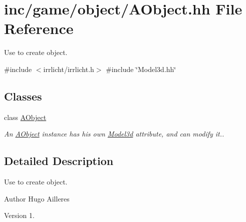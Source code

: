 \hypertarget{AObject_8hh}{}\section{inc/game/object/\+A\+Object.hh File Reference}
\label{AObject_8hh}


Use to create object.  


{\ttfamily \#include $<$irrlicht/irrlicht.\+h$>$}\newline
{\ttfamily \#include \char`\"{}Model3d.\+hh\char`\"{}}\newline
\subsection*{Classes}
\begin{DoxyCompactItemize}
\item 
class \hyperlink{classAObject}{A\+Object}
\begin{DoxyCompactList}\small\item\em An \hyperlink{classAObject}{A\+Object} instance has his own \hyperlink{classModel3d}{Model3d} attribute, and can modify it.. \end{DoxyCompactList}\end{DoxyCompactItemize}


\subsection{Detailed Description}
Use to create object. 

\begin{DoxyAuthor}{Author}
Hugo Ailleres 
\end{DoxyAuthor}
\begin{DoxyVersion}{Version}
1. 
\end{DoxyVersion}

